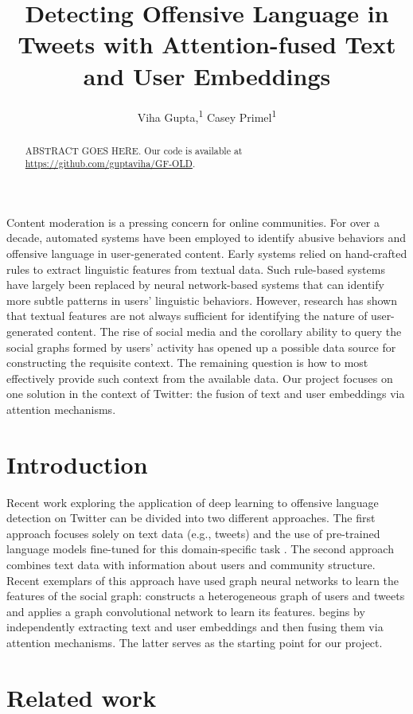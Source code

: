 \documentclass[letterpaper]{article} %
\title{Detecting Offensive Language in Tweets with Attention-fused Text and User Embeddings}
\author {
    Viha Gupta,\textsuperscript{\rm 1}
    Casey Primel\textsuperscript{\rm 1}
}
\begin{document}
\maketitle

\begin{abstract}
    ABSTRACT GOES HERE. Our code is available at \url{https://github.com/guptaviha/GF-OLD}.
\end{abstract}

Content moderation is a pressing concern for online communities. For over a decade, automated systems have been employed to identify abusive behaviors and offensive language in user-generated content. Early systems relied on hand-crafted rules to extract linguistic features from textual data. Such rule-based systems have largely been replaced by neural network-based systems that can identify more subtle patterns in users' linguistic behaviors. However, research has shown that textual features are not always sufficient for identifying the nature of user-generated content. The rise of social media and the corollary ability to query the social graphs formed by users' activity has opened up a possible data source for constructing the requisite context. The remaining question is how to most effectively provide such context from the available data. Our project focuses on one solution in the context of Twitter: the fusion of text and user embeddings via attention mechanisms.

\section{Introduction}

Recent work exploring the application of deep learning to offensive language detection on Twitter can be divided into two different approaches. The first approach focuses solely on text data (e.g., tweets) and the use of pre-trained language models fine-tuned for this domain-specific task \citep{liu2019-nuli}. The second approach combines text data with information about users and community structure. Recent exemplars of this approach have used graph neural networks to learn the features of the social graph: \citet{Mishra2019} constructs a heterogeneous graph of users and tweets and applies a graph convolutional network to learn its features. \citet{Miao2022} begins by independently extracting text and user embeddings and then fusing them via attention mechanisms. The latter serves as the starting point for our project.

\section{Related work}
\end{document}
